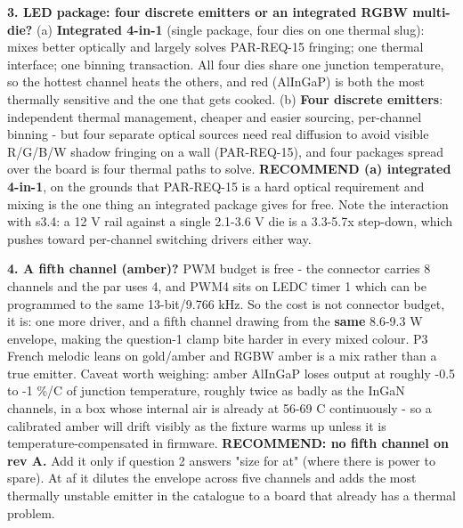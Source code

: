 \documentclass[11pt,a4paper]{article}
\begin{document}
\textbf{3. LED package: four discrete emitters or an integrated RGBW multi-die?} (a) \textbf{Integrated 4-in-1} (single package, four dies on one thermal slug): mixes better optically and largely solves PAR-REQ-15 fringing; one thermal interface; one binning transaction. All four dies share one junction temperature, so the hottest channel heats the others, and red (AlInGaP) is both the most thermally sensitive and the one that gets cooked. (b) \textbf{Four discrete emitters}: independent thermal management, cheaper and easier sourcing, per-channel binning - but four separate optical sources need real diffusion to avoid visible R/G/B/W shadow fringing on a wall (PAR-REQ-15), and four packages spread over the board is four thermal paths to solve. \textbf{RECOMMEND (a) integrated 4-in-1}, on the grounds that PAR-REQ-15 is a hard optical requirement and mixing is the one thing an integrated package gives for free. Note the interaction with s3.4: a 12 V rail against a single 2.1-3.6 V die is a 3.3-5.7x step-down, which pushes toward per-channel switching drivers either way.

\textbf{4. A fifth channel (amber)?} PWM budget is free - the connector carries 8 channels and the par uses 4, and PWM4 sits on LEDC timer 1 which can be programmed to the same 13-bit/9.766 kHz. So the cost is not connector budget, it is: one more driver, and a fifth channel drawing from the \textbf{same} 8.6-9.3 W envelope, making the question-1 clamp bite harder in every mixed colour. P3 French melodic leans on gold/amber and RGBW amber is a mix rather than a true emitter. Caveat worth weighing: amber AlInGaP loses output at roughly -0.5 to -1 \%/C of junction temperature, roughly twice as badly as the InGaN channels, in a box whose internal air is already at 56-69 C continuously - so a calibrated amber will drift visibly as the fixture warms up unless it is temperature-compensated in firmware. \textbf{RECOMMEND: no fifth channel on rev A.} Add it only if question 2 answers "size for at" (where there is power to spare). At af it dilutes the envelope across five channels and adds the most thermally unstable emitter in the catalogue to a board that already has a thermal problem.
\end{document}
